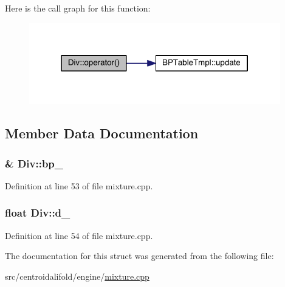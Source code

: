 Here is the call graph for this function\+:
\nopagebreak
\begin{figure}[H]
\begin{center}
\leavevmode
\includegraphics[width=310pt]{struct_div_a32c6fd1ea5034e8951b713d0eff713df_cgraph}
\end{center}
\end{figure}




\subsection{Member Data Documentation}
\hypertarget{struct_div_af9fa7f70561254ba9fc9848442570cff}{
\subsubsection[{bp\+\_\+}]{\& Div\+::bp\+\_\+}}\label{struct_div_af9fa7f70561254ba9fc9848442570cff}


Definition at line 53 of file mixture.\+cpp.

\hypertarget{struct_div_aa4f415b066d859ffeee86546aaffc6e8}{
\subsubsection[{d\+\_\+}]{\setlength{\rightskip}{0pt plus 5cm}float Div\+::d\+\_\+}}\label{struct_div_aa4f415b066d859ffeee86546aaffc6e8}


Definition at line 54 of file mixture.\+cpp.



The documentation for this struct was generated from the following file\+:\begin{DoxyCompactItemize}
\item 
src/centroidalifold/engine/\hyperlink{mixture_8cpp}{mixture.\+cpp}\end{DoxyCompactItemize}
